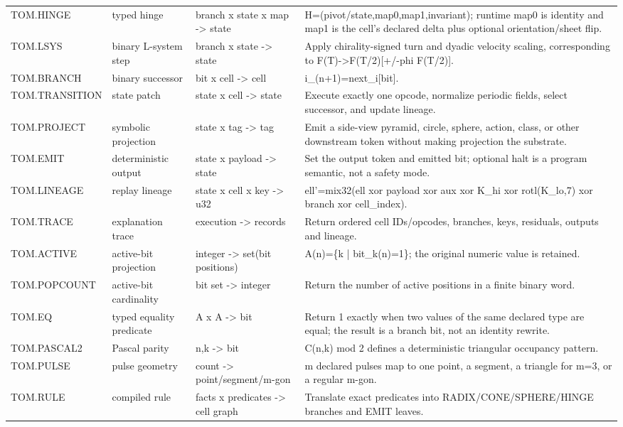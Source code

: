 \begin{longtable}{@{}L{0.18\textwidth}L{0.17\textwidth}L{0.20\textwidth}L{0.39\textwidth}@{}}
TOM.HINGE & typed hinge & branch x state x map -> state & H=(pivot/state,map0,map1,invariant); runtime map0 is identity and map1 is the cell's declared delta plus optional orientation/sheet flip. \\
TOM.LSYS & binary L-system step & branch x state -> state & Apply chirality-signed turn and dyadic velocity scaling, corresponding to F(T)->F(T/2)[+/-phi F(T/2)]. \\
TOM.BRANCH & binary successor & bit x cell -> cell & i\_(n+1)=next\_i[bit]. \\
TOM.TRANSITION & state patch & state x cell -> state & Execute exactly one opcode, normalize periodic fields, select successor, and update lineage. \\
TOM.PROJECT & symbolic projection & state x tag -> tag & Emit a side-view pyramid, circle, sphere, action, class, or other downstream token without making projection the substrate. \\
TOM.EMIT & deterministic output & state x payload -> state & Set the output token and emitted bit; optional halt is a program semantic, not a safety mode. \\
TOM.LINEAGE & replay lineage & state x cell x key -> u32 & ell'=mix32(ell xor payload xor aux xor K\_hi xor rotl(K\_lo,7) xor branch xor cell\_index). \\
TOM.TRACE & explanation trace & execution -> records & Return ordered cell IDs/opcodes, branches, keys, residuals, outputs and lineage. \\
TOM.ACTIVE & active-bit projection & integer -> set(bit positions) & A(n)=\{k | bit\_k(n)=1\}; the original numeric value is retained. \\
TOM.POPCOUNT & active-bit cardinality & bit set -> integer & Return the number of active positions in a finite binary word. \\
TOM.EQ & typed equality predicate & A x A -> bit & Return 1 exactly when two values of the same declared type are equal; the result is a branch bit, not an identity rewrite. \\
TOM.PASCAL2 & Pascal parity & n,k -> bit & C(n,k) mod 2 defines a deterministic triangular occupancy pattern. \\
TOM.PULSE & pulse geometry & count -> point/segment/m-gon & m declared pulses map to one point, a segment, a triangle for m=3, or a regular m-gon. \\
TOM.RULE & compiled rule & facts x predicates -> cell graph & Translate exact predicates into RADIX/CONE/SPHERE/HINGE branches and EMIT leaves. \\

\end{longtable}
